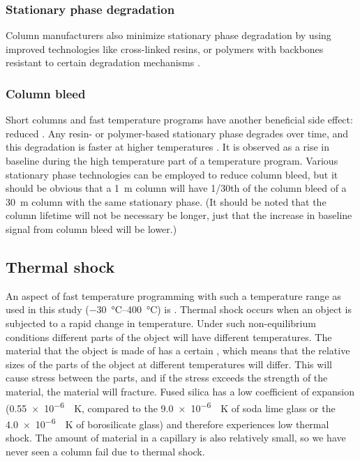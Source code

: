 \subsubsection{Stationary phase degradation}
Column manufacturers also minimize sta\-tion\-ary phase degradation by using
improved technologies like cross-linked resins, or polymers with backbones
resistant to certain degradation mechanisms \autocite{Day2003}.

\subsubsection{Column bleed}
Short columns and fast temperature programs have another beneficial side effect:
reduced . Any resin- or polymer-based stationary phase
degrades over time, and this degradation is faster at higher temperatures
\autocite[p. 66]{Mcnair2019}. It is observed as a rise in baseline during the
high temperature part of a temperature program. Various stationary phase
technologies can be employed to reduce column bleed, but it should be obvious
that a \SI{1}{\metre} column will have \num{1/30}th of the column bleed of a
\SI{30}{\metre} column with the same stationary phase. (It should be noted that
the column lifetime will not be necessary be longer, just that the increase in
baseline signal from column bleed will be lower.)

\subsection{Thermal shock}
An aspect of fast temperature programming with such a temperature range as used
in this study (\SIrange{-30}{400}{\celsius}) is . Thermal
shock occurs when an object is subjected to a rapid change in temperature. Under
such non-equilibrium conditions different parts of the object will have
different temperatures. The material that the object is made of has a certain
, which means that the relative sizes
of the parts of the object at different temperatures will differ. This will
cause stress between the parts, and if the stress exceeds the strength of the
material, the material will fracture. Fused silica has a low coefficient of
expansion (\SI{0.55e-6}{\per\kelvin}, compared to the \SI{9.0e-6}{\per\kelvin}
of soda lime glass or the \SI{4.0e-6}{\per\kelvin} of borosilicate glass) and
therefore experiences low thermal shock. The amount of material in a capillary
is also relatively small, so we have never seen a column fail due to thermal
shock.

